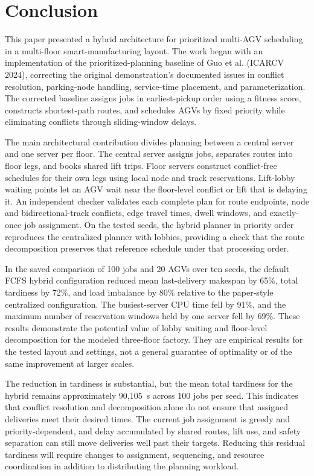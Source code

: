 \documentclass[11pt]{article}
\begin{document}
\section{Conclusion}

This paper presented a hybrid architecture for prioritized multi-AGV
scheduling in a multi-floor smart-manufacturing layout. The work began with
an implementation of the prioritized-planning baseline of Guo et al.
(ICARCV 2024), correcting the original demonstration's documented issues in
conflict resolution, parking-node handling, service-time placement, and
parameterization. The corrected baseline assigns jobs in earliest-pickup
order using a fitness score, constructs shortest-path routes, and schedules
AGVs by fixed priority while eliminating conflicts through sliding-window
delays.

The main architectural contribution divides planning between a central
server and one server per floor. The central server assigns jobs, separates
routes into floor legs, and books shared lift trips. Floor servers construct
conflict-free schedules for their own legs using local node and track
reservations. Lift-lobby waiting points let an AGV wait near the floor-level
conflict or lift that is delaying it. An independent checker validates each
complete plan for route endpoints, node and bidirectional-track conflicts,
edge travel times, dwell windows, and exactly-once job assignment. On the
tested seeds, the hybrid planner in priority order reproduces the centralized
planner with lobbies, providing a check that the route decomposition
preserves that reference schedule under that processing order.

In the saved comparison of 100 jobs and 20 AGVs over ten seeds, the default
FCFS hybrid configuration reduced mean last-delivery makespan by 65\%, total
tardiness by 72\%, and load imbalance by 80\% relative to the paper-style
centralized configuration. The busiest-server CPU time fell by 91\%, and the
maximum number of reservation windows held by one server fell by 69\%. These
results demonstrate the potential value of lobby waiting and floor-level
decomposition for the modeled three-floor factory. They are empirical
results for the tested layout and settings, not a general guarantee of
optimality or of the same improvement at larger scales.

The reduction in tardiness is substantial, but the mean total tardiness for
the hybrid remains approximately 90,105~s across 100 jobs per seed. This
indicates that conflict resolution and decomposition alone do not ensure
that assigned deliveries meet their desired times. The current job assignment
is greedy and priority-dependent, and delay accumulated by shared routes,
lift use, and safety separation can still move deliveries well past their
targets. Reducing this residual tardiness will require changes to assignment,
sequencing, and resource coordination in addition to distributing the
planning workload.
\end{document}
